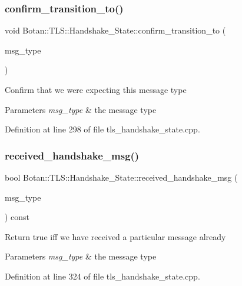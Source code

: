 \subsubsection{\texorpdfstring{confirm\+\_\+transition\+\_\+to()}{confirm\_transition\_to()}}
{\footnotesize\ttfamily void Botan\+::\+T\+L\+S\+::\+Handshake\+\_\+\+State\+::confirm\+\_\+transition\+\_\+to (\begin{DoxyParamCaption}\item[{Handshake\+\_\+\+Type}]{msg\+\_\+type }\end{DoxyParamCaption})}

Confirm that we were expecting this message type 
\begin{DoxyParams}{Parameters}
{\em msg\+\_\+type} & the message type \\
\hline
\end{DoxyParams}


Definition at line 298 of file tls\+\_\+handshake\+\_\+state.\+cpp.

\mbox{\label{class_botan_1_1_t_l_s_1_1_handshake___state_ae7eb930bfe4e17f0e28da8e34159bb3d}} 
\subsubsection{\texorpdfstring{received\+\_\+handshake\+\_\+msg()}{received\_handshake\_msg()}}
{\footnotesize\ttfamily bool Botan\+::\+T\+L\+S\+::\+Handshake\+\_\+\+State\+::received\+\_\+handshake\+\_\+msg (\begin{DoxyParamCaption}\item[{Handshake\+\_\+\+Type}]{msg\+\_\+type }\end{DoxyParamCaption}) const}

Return true iff we have received a particular message already 
\begin{DoxyParams}{Parameters}
{\em msg\+\_\+type} & the message type \\
\hline
\end{DoxyParams}


Definition at line 324 of file tls\+\_\+handshake\+\_\+state.\+cpp.


